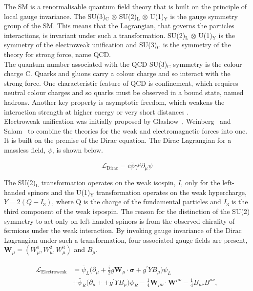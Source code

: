 The \ac{SM} is a renormalisable quantum field theory that is built on the principle of local gauge invariance.
The SU(3)$_{\text{C}}$ $\otimes$ SU(2)$_{\text{L}}$ $\otimes$ U(1)$_{\text{Y}}$ is the gauge symmetry group of the \ac{SM}.
This means that the Lagrangian, that governs the particles interactions, is invariant under such a transformation. 
SU(2)$_{\text{L}}$ $\otimes$ U(1)$_{\text{Y}}$ is the symmetry of the electroweak unification and SU(3)$_{\text{C}}$ is the symmetry of the theory for strong force, name \ac{QCD}. \\

The quantum number associated with the \ac{QCD} SU(3)$_\text{C}$ symmetry is the colour charge C.
Quarks and gluons carry a colour charge and so interact with the strong force.
One characteristic feature of \ac{QCD} is confinement, which requires neutral colour charges and so quarks must be observed in a bound state, named hadrons.
Another key property is asymptotic freedom, which weakens the interaction strength at higher energy or very short distances \cite{Gross:1973id,Politzer:1973fx}. \\

Electroweak unification was initially proposed by Glashow~\cite{Glashow:1961tr}, Weinberg~\cite{Weinberg:1967tq} and Salam~\cite{Salam:1968rm} to combine the theories for the weak and electromagnetic forces into one.
It is built on the premise of the Dirac equation.
The Dirac Lagrangian for a massless field, $\psi$, is shown below.

\begin{equation}
\mathcal{L}_{\text{Dirac}} = i\bar{\psi}\gamma^{\mu} \partial_{\mu} \psi
\end{equation}

The SU(2)$_{\text{L}}$ transformation operates on the weak isospin, $I$, only for the left-handed spinors and the U(1)$_{\text{Y}}$ transformation operates on the weak hypercharge, $Y=2(Q-I_{3})$, where Q is the charge of the fundamental particles and $I_3$ is the third component of the weak ispospin.
The reason for the distinction of the SU(2) symmetry to act only on left-handed spinors is from the observed chirality of fermions under the weak interaction.
By invoking gauge invariance of the Dirac Lagrangian under such a transformation, four associated gauge fields are present, $\boldsymbol{W}_{\mu} = (W^{1}_{\mu},W^{2}_{\mu},W^{3}_{\mu})$ and $B_{\mu}$.

\begin{align}
\begin{split}
\mathcal{L}_{\text{Electroweak}} &= \bar{\psi}_{L}\Big(\partial_{\mu} + \frac{i}{2} g \boldsymbol{W}_{\mu} \cdot \boldsymbol{\sigma} + g^{\prime} Y B_{\mu}  \Big) \psi_L \\
&+ \bar{\psi}_{R}\Big(\partial_{\mu} + + g^{\prime} Y B_{\mu}  \Big) \psi_R - \frac{1}{4} \boldsymbol{W}_{\mu\nu} \cdot \boldsymbol{W}^{\mu\nu} - \frac{1}{4}B_{\mu\nu}B^{\mu\nu},
\end{split}
\end{align}

